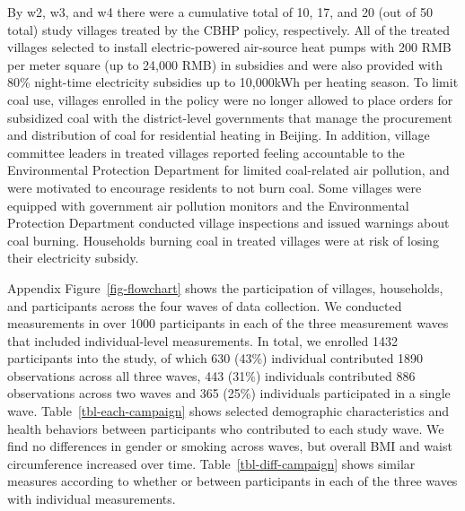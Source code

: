 \documentclass[
  letterpaper,
  DIV=11,
  numbers=noendperiod]{scrartcl}
\begin{document}
By w2, w3, and w4 there were a cumulative total of 10, 17, and 20 (out
of 50 total) study villages treated by the CBHP policy, respectively.
All of the treated villages selected to install electric-powered
air-source heat pumps with 200 RMB per meter square (up to 24,000 RMB)
in subsidies and were also provided with 80\% night-time electricity
subsidies up to 10,000kWh per heating season. To limit coal use,
villages enrolled in the policy were no longer allowed to place orders
for subsidized coal with the district-level governments that manage the
procurement and distribution of coal for residential heating in Beijing.
In addition, village committee leaders in treated villages reported
feeling accountable to the Environmental Protection Department for
limited coal-related air pollution, and were motivated to encourage
residents to not burn coal. Some villages were equipped with government
air pollution monitors and the Environmental Protection Department
conducted village inspections and issued warnings about coal burning.
Households burning coal in treated villages were at risk of losing their
electricity subsidy.

Appendix Figure~\ref{fig-flowchart} shows the participation of villages,
households, and participants across the four waves of data collection.
We conducted measurements in over 1000 participants in each of the three
measurement waves that included individual-level measurements. In total,
we enrolled 1432 participants into the study, of which 630 (43\%)
individual contributed 1890 observations across all three waves, 443
(31\%) individuals contributed 886 observations across two waves and 365
(25\%) individuals participated in a single wave.
Table~\ref{tbl-each-campaign} shows selected demographic characteristics
and health behaviors between participants who contributed to each study
wave. We find no differences in gender or smoking across waves, but
overall BMI and waist circumference increased over time.
Table~\ref{tbl-diff-campaign} shows similar measures according to
whether or between participants in each of the three waves with
individual measurements.
\end{document}
